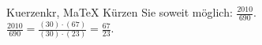 \begin{MAufgabe}{Kuerzen}{kr, MaTeX}
K\"urzen Sie soweit m\"oglich: $\frac{2010}{690}$.\\ 
\ifLsg\MLoesung
\quad $\frac{2010}{690}=\frac{(30)\cdot(67)}{(30)\cdot(23)}=\frac{67}{23}$.\else\relax\fi
 \end{MAufgabe}